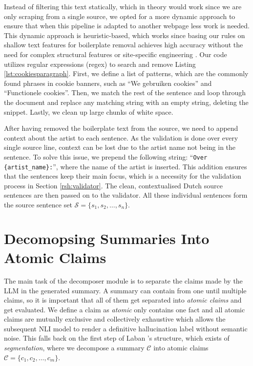 \noindent Instead of filtering this text statically, which in theory would work since we are only scraping from a single source, we opted for a more dynamic approach to ensure that when this pipeline is adapted to another webpage less work is needed. This dynamic approach is heuristic-based, which works since basing our rules on shallow text features for boilerplate removal achieves high accuracy without the need for complex structural features or site-specific engineering \cite{Kohlschütter2010boilerplatedetection}. Our code utilizes regular expressions (regex) to search and remove Listing \ref{lst:cookiesparagraph}. First, we define a list of patterns, which are the commonly found phrases in cookie banners, such as ``We gebruiken cookies'' and ``Functionele cookies''. Then, we match the rest of the sentence and loop through the document and replace any matching string with an empty string, deleting the snippet. Lastly, we clean up large chunks of white space. 

After having removed the boilerplate text from the source, we need to append context about the artist to each sentence. As the validation is done over every single source line, context can be lost due to the artist name not being in the sentence. To solve this issue, we prepend the following string: ``\texttt{Over \{artist\_name\}:}'', where the name of the artist is inserted. This addition ensures that the sentences keep their main focus, which is a necessity for the validation process in Section \ref{rsh:validator}. 
The clean, contextualised Dutch source sentences are then passed on to the validator. All these individual sentences form the source sentence set $\mathcal{S} = \{ s_1, s_2, \dots, s_n \}$. 


\section{Decomopsing Summaries Into Atomic Claims}\label{rsh:decomposer}
The main task of the decomposer module is to separate the claims made by the LLM in the generated summary. A summary can contain from one until multiple claims, so it is important that all of them get separated into \textit{atomic claims} and get evaluated. We define a claim as \textit{atomic} only contains one fact and all atomic claims are mutually exclusive and collectively exhaustive which allows the subsequent NLI model to render a definitive hallucination label without semantic noise. This falls back on the first step of Laban \etal's \cite{laban2021summaC} structure, which exists of \textit{segmentation}, where we decompose a summary $\mathcal{C}$ into atomic claims $\mathcal{C} = \{ c_1, c_2, \dots, c_m \}$. 


